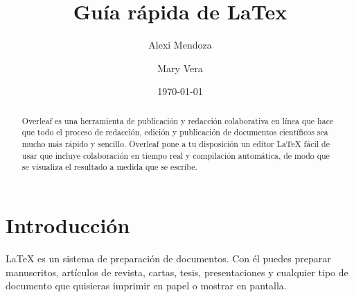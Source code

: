 \documentclass{article}
\title{Guía rápida de LaTex}
\author{Alexi Mendoza\\ \and Mary Vera \\ }
\date{\today} %
\begin{document}
\maketitle %

\begin{abstract}
Overleaf es una herramienta de publicación y redacción colaborativa en línea que hace que todo el proceso de redacción, edición y publicación de documentos científicos sea mucho más rápido y sencillo. Overleaf pone a tu disposición un editor LaTeX fácil de usar que incluye colaboración en tiempo real y compilación automática, de modo que se visualiza el resultado a medida que se escribe.
\end{abstract}

\section{Introducción}
LaTeX es un sistema de preparación de documentos. Con él puedes preparar manuscritos, artículos de revista, cartas, tesis, presentaciones y cualquier tipo de documento que quisieras imprimir en papel o mostrar en pantalla.
\end{document}
